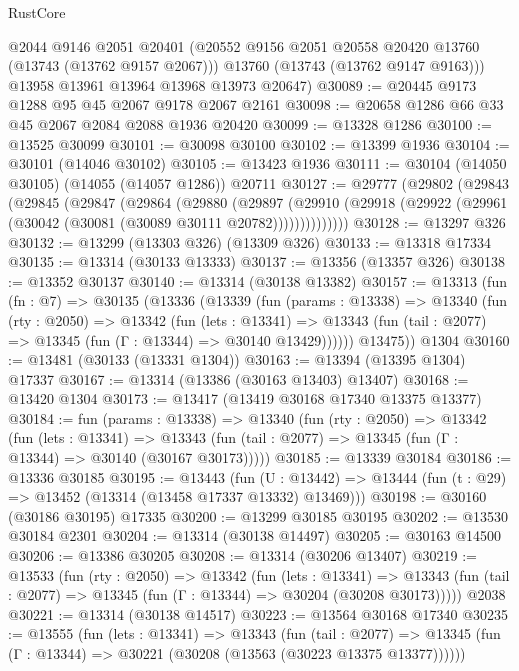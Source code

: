 \begin{lexlean}{RustCore}
\begin{coremodule}
        @2044
        @9146
        @2051
        @20401
        (@20552 @9156 @2051 @20558 @20420 @13760 (@13743 (@13762 @9157 @2067)))
        @13760
        (@13743 (@13762 @9147 @9163)))
      @13958
      @13961
      @13964
      @13968
      @13973
      @20647)
@30089 := @20445 @9173 @1288 @95 @45 @2067 @9178 @2067 @2161
@30098 := @20658 @1286 @66 @33 @45 @2067 @2084 @2088 @1936 @20420
@30099 := @13328 @1286
@30100 := @13525 @30099
@30101 := @30098 @30100
@30102 := @13399 @1936
@30104 := @30101 (@14046 @30102)
@30105 := @13423 @1936
@30111 := @30104 (@14050 @30105) (@14055 (@14057 @1286)) @20711
@30127 := @29777
    (@29802
      (@29843
        (@29845
          (@29847
            (@29864
              (@29880
                (@29897
                  (@29910
                    (@29918 (@29922 (@29961 (@30042 (@30081 (@30089 @30111 @20782))))))))))))))
@30128 := @13297 @326
@30132 := @13299 (@13303 @326) (@13309 @326)
@30133 := @13318 @17334
@30135 := @13314 (@30133 @13333)
@30137 := @13356 (@13357 @326)
@30138 := @13352 @30137
@30140 := @13314 (@30138 @13382)
@30157 := @13313
    (fun (fn : @7) =>
    @30135
      (@13336
        (@13339
          (fun (params : @13338) =>
          @13340
            (fun (rty : @2050) =>
            @13342
              (fun (lets : @13341) =>
              @13343 (fun (tail : @2077) => @13345 (fun (Γ : @13344) => @30140 @13429))))))
        @13475))
    @1304
@30160 := @13481 (@30133 (@13331 @1304))
@30163 := @13394 (@13395 @1304) @17337
@30167 := @13314 (@13386 (@30163 @13403) @13407)
@30168 := @13420 @1304
@30173 := @13417 (@13419 @30168 @17340 @13375 @13377)
@30184 := fun (params : @13338) =>
  @13340
    (fun (rty : @2050) =>
    @13342
      (fun (lets : @13341) =>
      @13343 (fun (tail : @2077) => @13345 (fun (Γ : @13344) => @30140 (@30167 @30173)))))
@30185 := @13339 @30184
@30186 := @13336 @30185
@30195 := @13443
    (fun (U : @13442) => @13444 (fun (t : @29) => @13452 (@13314 (@13458 @17337 @13332) @13469)))
@30198 := @30160 (@30186 @30195) @17335
@30200 := @13299 @30185 @30195
@30202 := @13530 @30184 @2301
@30204 := @13314 (@30138 @14497)
@30205 := @30163 @14500
@30206 := @13386 @30205
@30208 := @13314 (@30206 @13407)
@30219 := @13533
    (fun (rty : @2050) =>
    @13342
      (fun (lets : @13341) =>
      @13343 (fun (tail : @2077) => @13345 (fun (Γ : @13344) => @30204 (@30208 @30173)))))
    @2038
@30221 := @13314 (@30138 @14517)
@30223 := @13564 @30168 @17340
@30235 := @13555
    (fun (lets : @13341) =>
    @13343
      (fun (tail : @2077) =>
      @13345 (fun (Γ : @13344) => @30221 (@30208 (@13563 (@30223 @13375 @13377))))))

\end{coremodule}
\end{lexlean}
